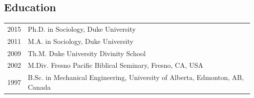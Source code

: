 \subsection*{Education}
\begin{longtable}{p{} p{}}
2015 & Ph.D. in Sociology, Duke University\\
2011 & M.A. in Sociology, Duke University\\
2009 & Th.M. Duke University Divinity School\\
2002 & M.Div. Fresno Pacific Biblical Seminary, Fresno, CA, USA\\
1997 & B.Sc. in Mechanical Engineering, University of Alberta, Edmonton, AB, Canada \\
\end{longtable}